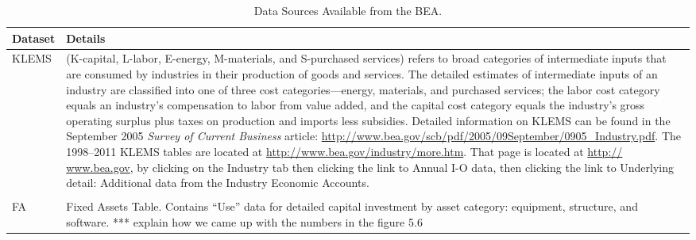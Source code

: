 \begin{table}
\caption[Data Sources Available from the BEA]{Data Sources Available from the BEA.}
\begin{center}
  \begin{tabular}{l @{\hspace{2em}} p{10cm}}
   \toprule 
    Dataset & Details  \\ 

	\midrule
KLEMS &
(K-capital, L-labor, E-energy, M-materials, and S-purchased services) refers to broad categories of intermediate inputs that are consumed by industries in their production of goods and services.  The detailed estimates of intermediate inputs of an industry are classified into one of three cost categories—energy, materials, and purchased services; the labor cost category equals an industry’s compensation to labor from value added, and the capital cost category equals the industry’s gross operating surplus plus taxes on production and imports less subsidies.  Detailed information on KLEMS can be found in the September 2005 \emph{ Survey of Current Business} article: \url{http://www.bea.gov/scb/pdf/2005/09September/0905\_Industry.pdf}. The 1998--2011 KLEMS tables are located at 
\url{ http://www.bea.gov/industry/more.htm}. That page is located at \url{http:// www.bea.gov}, by clicking on the Industry tab then clicking the link to Annual I-O data, then clicking the link to Underlying detail: Additional data from the Industry Economic Accounts. \\
 & \\
FA & 
Fixed Assets Table. Contains “Use” data for detailed capital investment by asset category: equipment, structure, and software.   *** explain how we came up with the numbers in the figure 5.6


\end{tabular}
\end{center}
\end{table}
